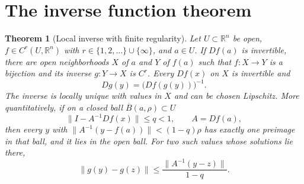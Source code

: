 \documentclass[11pt,oneside,openany]{book}
\newtheorem{theorem}{Theorem}[chapter]
\theoremstyle{definition}
\theoremstyle{remark}
\newcommand{\R}{\mathbb R}
\newcommand{\norm}[1]{\lVert#1\rVert}
\newcommand{\family}[1]{}
\begin{document}
\section{The inverse function theorem}
\family{K04.04.03}\family{K04.04.04}

\begin{theorem}[Local inverse with finite regularity]\label{d04:04:inverse-function}
Let $U\subset\R^n$ be open, $f\in C^r(U,\R^n)$ with
$r\in\{1,2,\ldots\}\cup\{\infty\}$, and $a\in U$. If $Df(a)$
is invertible, there are open neighborhoods $X$ of $a$ and $Y$ of $f(a)$
such that $f:X\to Y$ is a bijection and its inverse $g:Y\to X$ is $C^r$.
Every $Df(x)$ on $X$ is invertible and
\[
 Dg(y)=\big(Df(g(y))\big)^{-1}.
\]
The inverse is locally unique with values in $X$ and can be chosen Lipschitz.
More quantitatively, if on a closed ball $\overline B(a,\rho)\subset U$
\[
 \norm{I-A^{-1}Df(x)}\leq q<1,\qquad A=Df(a),
\]
then every $y$ with $\norm{A^{-1}(y-f(a))}<(1-q)\rho$ has exactly
one preimage in that ball, and it lies in the open ball. For two such values
whose solutions lie there,
\[
 \norm{g(y)-g(z)}\leq\frac{\norm{A^{-1}(y-z)}}{1-q}.
\]
\end{theorem}
\end{document}
